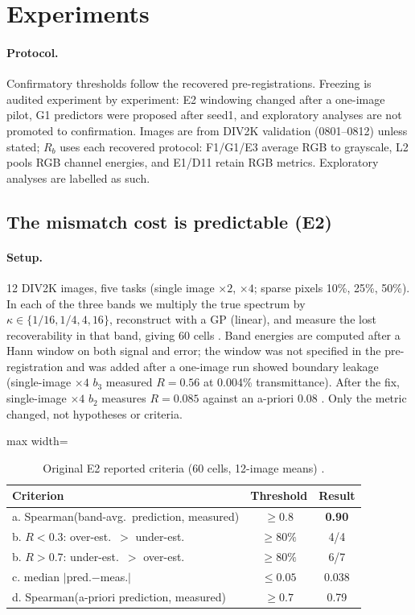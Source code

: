 \section{Experiments}\label{sec:exp}

\paragraph{Protocol.} Confirmatory thresholds follow the recovered pre-registrations. Freezing is audited experiment by experiment: E2 windowing changed after a one-image pilot, G1 predictors were proposed after seed1, and exploratory analyses are not promoted to confirmation. Images are from
DIV2K validation (0801--0812) unless stated; $R_b$ uses each recovered protocol: F1/G1/E3 average RGB to grayscale, L2 pools RGB channel energies, and E1/D11 retain RGB metrics.
Exploratory analyses are labelled as such.

\subsection{The mismatch cost is predictable (E2)}\label{sec:exp-e2}

\paragraph{Setup.} 12 DIV2K images, five tasks (single image $\times2$,
$\times4$; sparse pixels 10\%, 25\%, 50\%). In each of the three bands we
multiply the true spectrum by $\kappa\in\{1/16,1/4,4,16\}$, reconstruct with a
GP (linear), and measure the lost recoverability in that band, giving 60
cells . Band energies are computed after a Hann window on
both signal and error; the window was not specified in the pre-registration
and was added after a one-image run showed boundary leakage (single-image
$\times4$ $b_3$ measured $R=0.56$ at 0.004\% transmittance). After the fix,
single-image $\times4$ $b_2$ measures $R=0.085$ against an a-priori 0.08
. Only the metric changed, not hypotheses or criteria.

\begin{table}[t]\centering\small
\caption{Original E2 reported criteria (60 cells, 12-image means)
.}\label{tab:e2}
\begin{adjustbox}{max width=\linewidth}\begin{tabular}{lcc}\toprule
Criterion & Threshold & Result\\\midrule
a. Spearman(band-avg.\ prediction, measured) & $\ge0.8$ & \textbf{0.90}\\
b. $R<0.3$: over-est.\ $>$ under-est. & $\ge80\%$ & 4/4\\
b. $R>0.7$: under-est.\ $>$ over-est. & $\ge80\%$ & 6/7\\
c. median $|$pred.$-$meas.$|$ & $\le0.05$ & 0.038\\
d. Spearman(a-priori prediction, measured) & $\ge0.7$ & 0.79\\
\bottomrule\end{tabular}\end{adjustbox}
\end{table}

